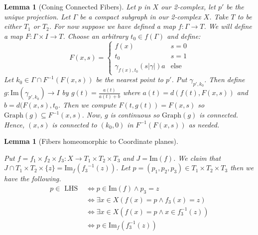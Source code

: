 \documentclass{article}
\theoremstyle{mystyle}
\newtheorem{lem}[thm]{Lemma}
\theoremstyle{remark}
\begin{document}
\begin{lem}
    [Coning Connected Fibers]
    \label{lem:confib} 
    Let \(p\) in \(X\) our 2-complex, let \(p'\) be the unique projection. Let \(\Gamma\) be a compact subgraph in our 2-complex \(X\).  Take \(T\) to be either \(T_{1}\) or \(T_{2}\). For now suppose we have defined a map \(f: \Gamma \to T\). We will define a map \(F: \Gamma \times I \to T\). Choose an arbitrary \(t_{0} \in f(\Gamma) \) and define: 
    \[ F(x,s) = 
        \begin{cases} 
            f(x)& s=0\\ 
            t_{0} & s=1\\
            \gamma_{f(x),t_{0}} (s | \gamma |)a & \text{else}
        \end{cases}
    \]
    Let \(k_{0} \in \Gamma \cap F^{-1} (F(x,s))\) be the nearest point to \(p'\). Put \(\gamma_{p',k_{0}}\). Then define \(g: \text{Im} (\gamma_{p',k_{0}}) \to I\) by \(g(t) = \frac{a(t)}{a(t)+b}\) where \(a(t) = d(f(t), F(x,s))\) and \(b = d(F(x,s), t_{0}\). Then we compute \(F(t,g(t))=F(x,s)\) so \(\text{Graph}(g) \subseteq F^{-1} (x,s)\). Now, \(g\) is continuous so \(\text{Graph}(g)\) is connected. Hence, \((x,s)\) is connected to \((k_{0} ,0)\) in \(F^{-1} (F(x,s))\) as needed.
\end{lem}
\begin{lem}
    [Fibers homeomorphic to Coordinate planes]
 \label{lem:fibershomeoplanes} 


    Put \(f =  f_{1} \times f_{2} \times f_{3}: X \to T_{1} \times T_{2} \times T_{3} \) and \(J = \text{Im}(f)\). We claim that \(J \cap T_{1} \times T_{2} \times \{z\} = \text{Im}_{f} ({ f_{3}}^{-1}(z))\). Let \(p = (p_{1}, p_{2} , p_{3}) \in T_{1} \times T_{2} \times T_{3}\) then we have the following. 
    \begin{align*}
        p \in \text { LHS } & \Longleftrightarrow p \in \text{Im}(f) \wedge p_{3} = z \\ 
        & \Longleftrightarrow \exists x \in X (f(x)=p \wedge  f_3(x)=z)\\
        & \Longleftrightarrow \exists x \in X (f(x)=p \wedge x \in f_3^{-1} (z))\\
        & \Longleftrightarrow p \in \text{Im}_f(f_3^{-1} (z))
    \end{align*}
\end{lem}
\end{document}
